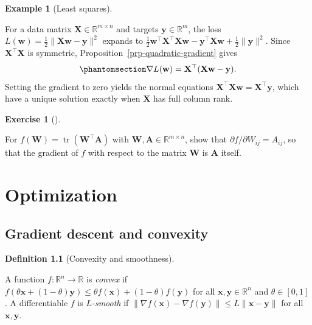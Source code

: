\documentclass[
  english,
  11pt,
  a4paper,
  twoside,
  open=any,
  numbers=noenddot]{scrbook}
\theoremstyle{plain}
\theoremstyle{plain}
\theoremstyle{plain}
\theoremstyle{definition}
\newtheorem{definition}{Definition}[chapter]
\theoremstyle{definition}
\newtheorem{exercise}{Exercise}[chapter]
\theoremstyle{definition}
\newtheorem{example}{Example}[chapter]
\theoremstyle{remark}
\begin{document}
\begin{example}[Least
squares]\protect\hypertarget{exm-least-squares}{}\label{exm-least-squares}

For a data matrix \(\mathbf{X} \in \mathbb{R}^{m\times n}\) and targets
\(\mathbf{y}\in\mathbb{R}^m\), the loss
\(L(\mathbf{w}) = \tfrac12 \lVert \mathbf{X}\mathbf{w} - \mathbf{y}\rVert^2\)
expands to
\(\tfrac12\mathbf{w}^\top\mathbf{X}^\top\mathbf{X}\mathbf{w} - \mathbf{y}^\top\mathbf{X}\mathbf{w} + \tfrac12\lVert\mathbf{y}\rVert^2\).
Since \(\mathbf{X}^\top\mathbf{X}\) is symmetric,
Proposition~\ref{prp-quadratic-gradient} gives
\begin{equation}\protect\phantomsection\label{eq-least-squares-gradient}{
\nabla L(\mathbf{w}) = \mathbf{X}^\top(\mathbf{X}\mathbf{w} - \mathbf{y}).
}\end{equation} Setting the gradient to zero yields the normal equations
\(\mathbf{X}^\top\mathbf{X}\mathbf{w} = \mathbf{X}^\top\mathbf{y}\),
which have a unique solution exactly when \(\mathbf{X}\) has full column
rank.

\end{example}

\begin{exercise}[]\protect\hypertarget{exr-trace-gradient}{}\label{exr-trace-gradient}

For \(f(\mathbf{W}) = \operatorname{tr}(\mathbf{W}^\top \mathbf{A})\)
with \(\mathbf{W},\mathbf{A}\in\mathbb{R}^{m\times n}\), show that
\(\partial f/\partial W_{ij} = A_{ij}\), so that the gradient of \(f\)
with respect to the matrix \(\mathbf{W}\) is \(\mathbf{A}\) itself.

\end{exercise}


\chapter{Optimization}\label{sec-optimization}

\section{Gradient descent and
convexity}\label{sec-optimization-gradient-descent-and-convexity}

\begin{definition}[Convexity and
smoothness]\protect\hypertarget{def-convex}{}\label{def-convex}

A function \(f\colon \mathbb{R}^n\to\mathbb{R}\) is \emph{convex} if
\(f(\theta\mathbf{x} + (1-\theta)\mathbf{y}) \le \theta f(\mathbf{x}) + (1-\theta) f(\mathbf{y})\)
for all \(\mathbf{x},\mathbf{y}\in\mathbb{R}^n\) and \(\theta\in[0,1]\).
A differentiable \(f\) is \emph{\(L\)-smooth} if
\(\lVert\nabla f(\mathbf{x}) - \nabla f(\mathbf{y})\rVert \le L\lVert\mathbf{x}-\mathbf{y}\rVert\)
for all \(\mathbf{x},\mathbf{y}\).

\end{definition}
\end{document}

